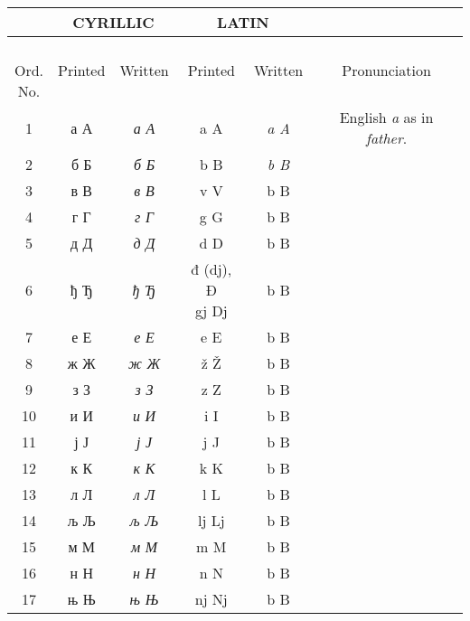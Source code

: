         \hspace*{-1.75cm}\begin{tabularx}{\paperwidth}{c|c|c|c|c|c}
            {} & \multicolumn{2}{c|}{\textbf{\Large CYRILLIC}} & \multicolumn{2}{c|}{\textbf{\Large LATIN}} &\\
            \hline
            \shortstack{\\[1pt] Ord.\\ No.} & Printed & Written & Printed & Written & Pronunciation\\
            \hline
            1 & {\LARGE а А} & {\LARGE\it  а А} & a A & {\LARGE \it a A}& English \emph{a} as in \emph{father}.\\
            2 & {\LARGE б Б} & {\LARGE \it б Б} & {\LARGE b B}    & {\LARGE \it b B} & \\
            3 & {\LARGE в В} & {\LARGE \it в В} &  {\LARGE v V}   & {\LARGE b B} & \\
            4 & {\LARGE г Г} & {\LARGE \it г Г} &  {\LARGE g G}   & {\LARGE b B} & \\
            5 & {\LARGE д Д} & {\LARGE \it д Д} & {\LARGE d D}    & {\LARGE b B} & \\
            6 & {\LARGE ђ Ђ} & {\LARGE \it ђ Ђ} & \shortstack{\LARGE đ (dj), Đ\\\LARGE gj \hfill Dj}    & {\LARGE b B} & \\
            7 & {\LARGE е Е} & {\LARGE \it е Е} & {\LARGE e E}    & {\LARGE b B} & \\
            8 & {\LARGE ж Ж} & {\LARGE \it ж Ж} & {\LARGE ž Ž}    & {\LARGE b B} & \\
            9 & {\LARGE з З} & {\LARGE \it з З} & {\LARGE z Z}    & {\LARGE b B} & \\
            10 & {\LARGE и И} & {\LARGE \it и И} & {\LARGE i I}    & {\LARGE b B} & \\
            11 & {\LARGE ј Ј} & {\LARGE \it ј Ј} & {\LARGE j J}    & {\LARGE b B} & \\
            12 & {\LARGE к К} & {\LARGE \it к К} & {\LARGE k K}    & {\LARGE b B} & \\
            13 & {\LARGE л Л} & {\LARGE \it л Л} & {\LARGE l L}    & {\LARGE b B} & \\
            14 & {\LARGE љ Љ} & {\LARGE \it љ Љ} & {\LARGE lj Lj}    & {\LARGE b B} & \\
            15 & {\LARGE м М} & {\LARGE \it м М} & {\LARGE m M}    & {\LARGE b B} & \\
            16 & {\LARGE н Н} & {\LARGE \it н Н} & {\LARGE n N}    & {\LARGE b B} & \\
            17 & {\LARGE њ Њ} & {\LARGE \it њ Њ} & {\LARGE nj Nj}    & {\LARGE b B} & \\
        \end{tabularx}
        
